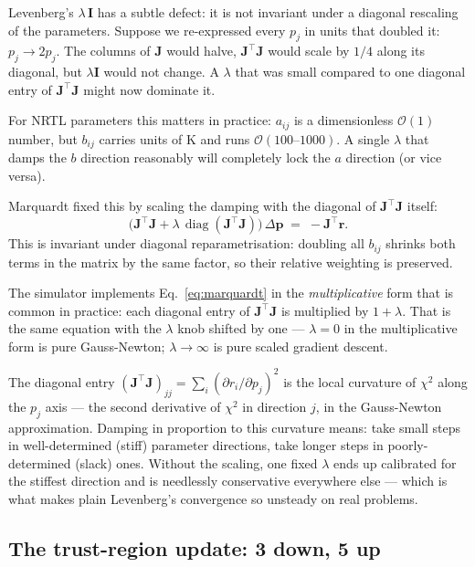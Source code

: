 \documentclass[11pt,a4paper]{article}
\newcommand{\Jac}{\mathbf{J}}
\newcommand{\pv}{\mathbf{p}}                          %
\newcommand{\rv}{\mathbf{r}}                          %
\DeclareMathOperator{\diag}{diag}
\begin{document}
Levenberg's $\lambda\,\mathbf{I}$ has a subtle defect: it is not
invariant under a diagonal rescaling of the parameters. Suppose we
re-expressed every $p_j$ in units that doubled it: $p_j \to 2 p_j$.
The columns of $\Jac$ would halve, $\Jac^{\!\top}\Jac$ would scale
by $1/4$ along its diagonal, but $\lambda\mathbf{I}$ would not
change. A $\lambda$ that was small compared to one diagonal entry
of $\Jac^{\!\top}\Jac$ might now dominate it.

For NRTL parameters this matters in practice: $a_{ij}$ is a
dimensionless $\mathcal{O}(1)$ number, but $b_{ij}$ carries units
of K and runs $\mathcal{O}(100\text{--}1000)$. A single $\lambda$
that damps the $b$ direction reasonably will completely lock the
$a$ direction (or vice versa).

Marquardt \cite{Marquardt63} fixed this by scaling the damping
with the diagonal of $\Jac^{\!\top}\Jac$ itself:
\begin{equation}
   \boxed{\;
   \bigl(\Jac^{\!\top}\Jac + \lambda\,\diag(\Jac^{\!\top}\Jac)\bigr)\,\Delta\pv
   \;=\; -\Jac^{\!\top}\rv.
   \;}
   \label{eq:marquardt}
\end{equation}
This is invariant under diagonal reparametrisation: doubling all
$b_{ij}$ shrinks both terms in the matrix by the same factor, so
their relative weighting is preserved.

The simulator implements Eq.~\eqref{eq:marquardt} in the
\emph{multiplicative} form that is common in practice: each
diagonal entry of $\Jac^{\!\top}\Jac$ is multiplied by $1 +
\lambda$. That is the same equation with the $\lambda$ knob
shifted by one --- $\lambda = 0$ in the multiplicative form is
pure Gauss-Newton; $\lambda \to \infty$ is pure scaled gradient
descent.

\begin{intuition}
The diagonal entry $(\Jac^{\!\top}\Jac)_{jj} = \sum_i (\partial
r_i / \partial p_j)^2$ is the local curvature of $\chi^2$ along
the $p_j$ axis --- the second derivative of $\chi^2$ in direction
$j$, in the Gauss-Newton approximation. Damping in proportion to
this curvature means: take small steps in well-determined (stiff)
parameter directions, take longer steps in poorly-determined
(slack) ones. Without the scaling, one fixed $\lambda$ ends up
calibrated for the stiffest direction and is needlessly
conservative everywhere else --- which is what makes plain
Levenberg's convergence so unsteady on real problems.
\end{intuition}

\subsection{The trust-region update: 3 down, 5 up}
\end{document}
